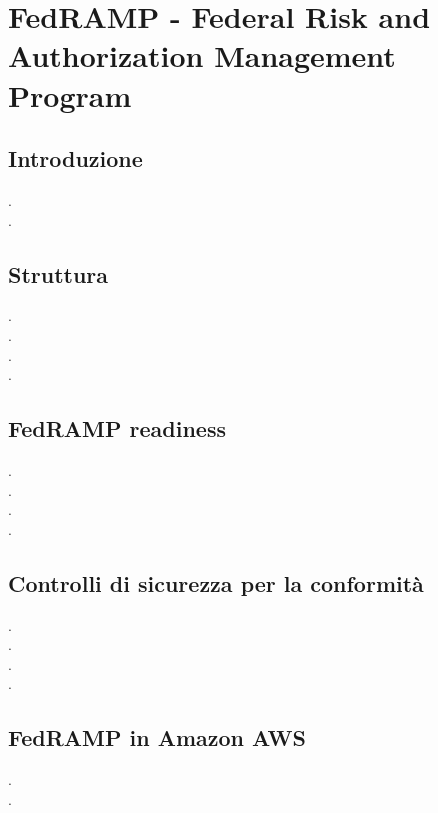 \documentclass[../main.tex]{subfiles}
\begin{document}
\chapter{FedRAMP - Federal Risk and Authorization Management Program}
\section{Introduzione}
.\\\newpage
.\\\newpage
\section{Struttura}
.\\\newpage
.\\\newpage
.\\\newpage
.\\\newpage
\section{FedRAMP readiness}
.\\\newpage
.\\\newpage
.\\\newpage
.\\\newpage
\section{Controlli di sicurezza per la conformità}
.\\\newpage
.\\\newpage
.\\\newpage
.\\\newpage
\section{FedRAMP in Amazon AWS}
.\\\newpage
.\\\newpage
\end{document}
